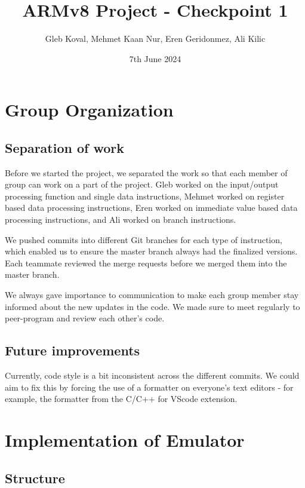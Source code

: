 \documentclass[11pt]{article}
\begin{document}
\title{\vspace{-1in}ARMv8 Project - Checkpoint 1}
\author {Gleb Koval, Mehmet Kaan Nur, Eren Geridonmez, Ali Kilic}
\date {7th June 2024}
\maketitle

\section{Group Organization}
\subsection{Separation of work} 

    Before we started the project, we separated the work so that each member of group can work on a part of the project. Gleb worked on the input/output processing function and single data instructions, Mehmet worked on register based data processing instructions, Eren worked on immediate value based data processing instructions, and Ali worked on branch instructions.
    
    We pushed commits into different Git branches for each type of instruction, which enabled us to ensure the master branch always had the finalized versions. Each teammate reviewed the merge requests before we merged them into the master branch.

    We always gave importance to communication to make each group member stay informed about the new updates in the code. We made sure to meet regularly to peer-program and review each other's code.

\subsection{Future improvements}

    Currently, code style is a bit inconsistent across the different commits. We could aim to fix this by forcing the use of a formatter on everyone's text editors - for example, the formatter from the C/C++ for VScode extension.


\section{Implementation of Emulator}
\subsection{Structure}
\end{document}
